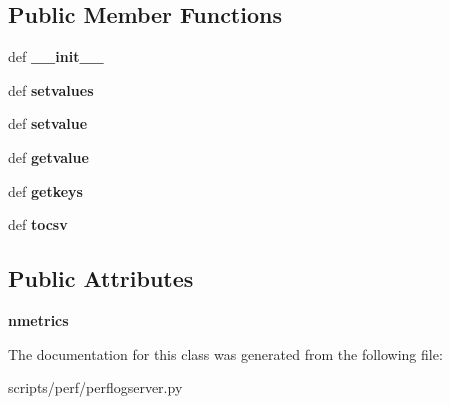 \subsection*{Public Member Functions}
\begin{DoxyCompactItemize}
\item 
\hypertarget{classperflogserver_1_1_node_metrics_aa51e7ab96451768952abf4e4a0d81576}{def {\bfseries \+\_\+\+\_\+init\+\_\+\+\_\+}}\label{classperflogserver_1_1_node_metrics_aa51e7ab96451768952abf4e4a0d81576}

\item 
\hypertarget{classperflogserver_1_1_node_metrics_ab302ced4b42e89167d770a95a576bea0}{def {\bfseries setvalues}}\label{classperflogserver_1_1_node_metrics_ab302ced4b42e89167d770a95a576bea0}

\item 
\hypertarget{classperflogserver_1_1_node_metrics_ab63d629812b04c53cb7d6953a897fd61}{def {\bfseries setvalue}}\label{classperflogserver_1_1_node_metrics_ab63d629812b04c53cb7d6953a897fd61}

\item 
\hypertarget{classperflogserver_1_1_node_metrics_ade8e265b2f74561a7a6f5425f0f6a11c}{def {\bfseries getvalue}}\label{classperflogserver_1_1_node_metrics_ade8e265b2f74561a7a6f5425f0f6a11c}

\item 
\hypertarget{classperflogserver_1_1_node_metrics_a6eb13c9ff183936e4e12dbd921196bb1}{def {\bfseries getkeys}}\label{classperflogserver_1_1_node_metrics_a6eb13c9ff183936e4e12dbd921196bb1}

\item 
\hypertarget{classperflogserver_1_1_node_metrics_a84e68a67b09d2808858a4277d1816bdc}{def {\bfseries tocsv}}\label{classperflogserver_1_1_node_metrics_a84e68a67b09d2808858a4277d1816bdc}

\end{DoxyCompactItemize}
\subsection*{Public Attributes}
\begin{DoxyCompactItemize}
\item 
\hypertarget{classperflogserver_1_1_node_metrics_aa83ba86dac6174e149d76e908c72c749}{{\bfseries nmetrics}}\label{classperflogserver_1_1_node_metrics_aa83ba86dac6174e149d76e908c72c749}

\end{DoxyCompactItemize}


The documentation for this class was generated from the following file\+:\begin{DoxyCompactItemize}
\item 
scripts/perf/perflogserver.\+py\end{DoxyCompactItemize}
